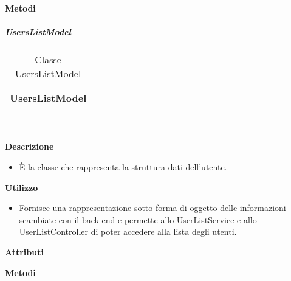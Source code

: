 		\textbf{Metodi} 
	\begin{itemize}
		\end{itemize}
			\subparagraph{UsersListModel} 
\begin{table}[ht]
\begin{center}
\bgroup
	\setlength{\arrayrulewidth}{0.6mm}
	\def\arraystretch{1}
		\begin{tabular}{ | p{12cm} | }
				\hline  
					\centerline{\textbf{UsersListModel}}
		\\ \hline 
				\hline
				\hline
		
		\end{tabular}
\egroup
\caption{Classe UsersListModel}
\end{center}
\end{table}  \textbf{\\ \\ Descrizione} 
					\begin{itemize}
						\item[] È la classe che rappresenta la struttura dati dell'utente.
					\end{itemize}      
				\textbf{Utilizzo}  
					\begin{itemize}
						\item[] Fornisce una rappresentazione sotto forma di oggetto delle informazioni scambiate con il back-end e permette allo UserListService e allo UserListController di poter accedere alla lista degli utenti.
					\end{itemize}
			 \textbf{Attributi} 
	\begin{itemize}
		\end{itemize}
		
		\textbf{Metodi} 
	\begin{itemize}
		\end{itemize}